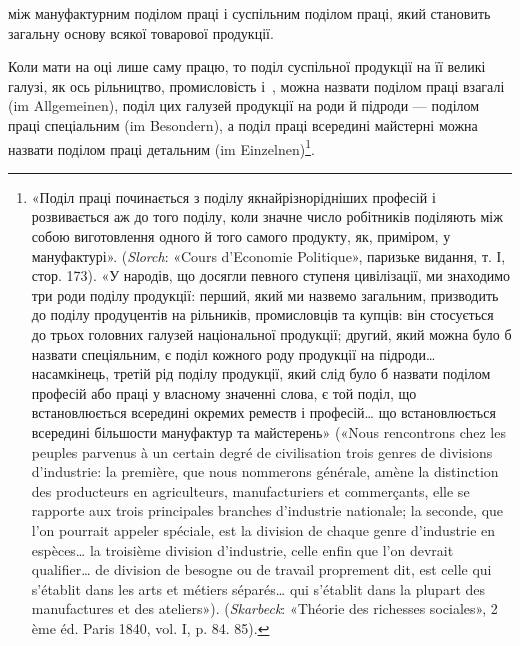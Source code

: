 \parcont{}  %
між мануфактурним поділом праці і суспільним поділом праці,
який становить загальну основу всякої товарової продукції.

Коли мати на оці лише саму працю, то поділ суспільної продукції
на її великі галузі, як ось рільництво, промисловість
і~, можна назвати поділом праці взагалі (im Allgemeinen),
поділ цих галузей продукції на роди й підроди — поділом праці
спеціальним (im Besondern), а поділ праці всередині майстерні
можна назвати поділом праці детальним (im Einzelnen)\footnote{
«Поділ праці починається з поділу якнайрізнорідніших професій
і розвивається аж до того поділу, коли значне число робітників поділяють
між собою виготовлення одного й того самого продукту, як, приміром,
у мануфактурі». (\emph{Slorch}: «Cours d’Economie Politique», паризьке
видання, т. І, стор. 173). «У народів, що досягли певного ступеня цивілізації,
ми знаходимо три роди поділу продукції: перший, який ми назвемо
загальним, призводить до поділу продуцентів на рільників, промисловців
та купців: він стосується до трьох головних галузей національної
продукції; другий, який можна було б назвати спеціяльним, є поділ
кожного роду продукції на підроди\dots{} насамкінець, третій рід поділу
продукції, який слід було б назвати поділом професій або праці у власному
значенні слова, є той поділ, що встановлюється всередині окремих реместв
і професій\dots{} що встановлюється всередині більшости мануфактур
та майстерень» («Nous rencontrons chez les peuples parvenus à un certain
degré de civilisation trois genres de divisions d’industrie: la première,
que nous nommerons générale, amène la distinction des producteurs en
agriculteurs, manufacturiers et commerçants, elle se rapporte aux trois principales
branches d’industrie nationale; la seconde, que l’on pourrait appeler
spéciale, est la division de chaque genre d’industrie en espèces\dots{} la troisième
division d’industrie, celle enfin que l’on devrait qualifier\dots{} de division
de besogne ou de travail proprement dit, est celle qui s’établit dans les arts
et métiers séparés\dots{} qui s’établit dans la plupart des manufactures et des
ateliers»). (\emph{Skarbeck}: «Théorie des richesses sociales», 2 ème éd. Paris
1840, vol. I, p. 84. 85).
}.

